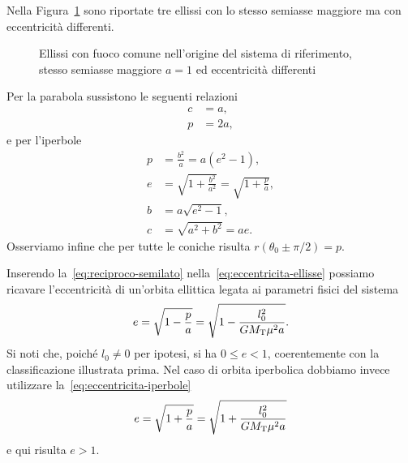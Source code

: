 Nella Figura~\ref{fig:ellissi-eccentricita} sono riportate tre ellissi con lo
stesso semiasse maggiore ma con eccentricità differenti.
\begin{figure}
  \centering
  \caption[Ellissi con diversi valori di eccentricità]{Ellissi con fuoco comune
    nell'origine del sistema di riferimento, stesso semiasse maggiore $a=1$ ed
    eccentricità differenti}
  \label{fig:ellissi-eccentricita}
\end{figure}

Per la parabola sussistono le seguenti relazioni
\begin{align}
  c &= a,\\
  p &= 2a,
\end{align}
e per l'iperbole
\begin{align}
  p &= \frac{b^2}{a} = a(e^2-1), \label{eq:semilato-iperbole}\\
  e &= \sqrt{1+\frac{b^2}{a^2}} =
  \sqrt{1+\frac{p}{a}}, \label{eq:eccentricita-iperbole}\\
  b &= a\sqrt{e^2-1}, \\
  c &= \sqrt{a^2+b^2} = ae.
\end{align}
Osserviamo infine che per tutte le coniche risulta $r(\theta_0\pm\pi/2)=p$.

Inserendo la~\eqref{eq:reciproco-semilato} nella~\eqref{eq:eccentricita-ellisse}
possiamo ricavare l'eccentricità di un'orbita ellittica legata ai parametri
fisici del sistema
\begin{equation}
  \label{eq:eccentricita-orbita-ellisse}
  e = \sqrt{1-\frac{p}{a}} = \sqrt{1-\frac{l_0^2}{GM_\textup{T}\mu^2a}}.
\end{equation}
Si noti che, poiché $l_0\neq 0$ per ipotesi, si ha $0\leq e<1$, coerentemente
con la classificazione illustrata prima. Nel caso di orbita iperbolica dobbiamo
invece utilizzare la~\eqref{eq:eccentricita-iperbole}
\begin{equation}
  \label{eq:eccentricita-orbita-iperbole}
  e = \sqrt{1+\frac{p}{a}} = \sqrt{1+\frac{l_0^2}{GM_\textup{T}\mu^2a}}
\end{equation}
e qui risulta $e>1$.

